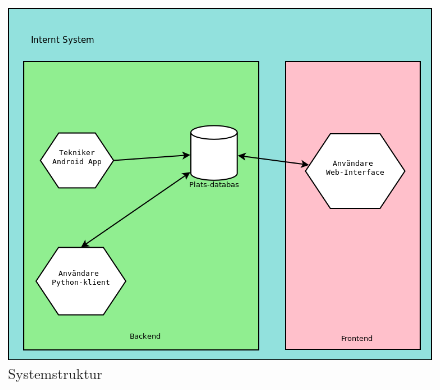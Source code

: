 \documentclass[swedish, a4paper,12pt]{article}
\begin{document}
\begin{figure}[H]
	\includegraphics[width=15cm]{media/systemStruktur.png}
	\caption{Systemstruktur}
	\label{fig:systemStruktur}
\end{figure}
\end{document}
